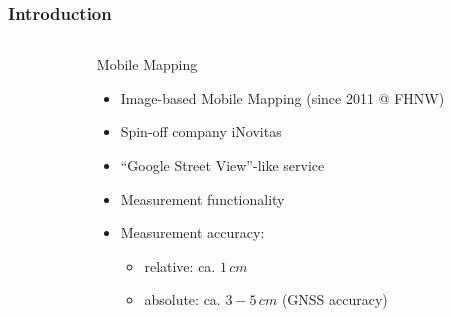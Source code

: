 \documentclass[aspectratio=169]{beamer}
\begin{document}
  \begin{frame}
   \frametitle{Introduction}
   \begin{columns}[onlytextwidth]
    \begin{column}{0.5\textwidth}
    
    
    \end{column}
    \begin{column}{0.5\textwidth}
    Mobile Mapping
      \begin{itemize}
       \item Image-based Mobile Mapping \newline(since 2011 @ FHNW)
       \item Spin-off company iNovitas
       \item ``Google Street View''-like service
       \item Measurement functionality
       \item Measurement accuracy:
       \begin{itemize}
        \item relative: ca. $1\, cm$
        \item absolute: ca. $3-5\, cm$ \newline(GNSS accuracy)
       \end{itemize}
      \end{itemize}
    \end{column}
   \end{columns}
  \end{frame}
\end{document}
